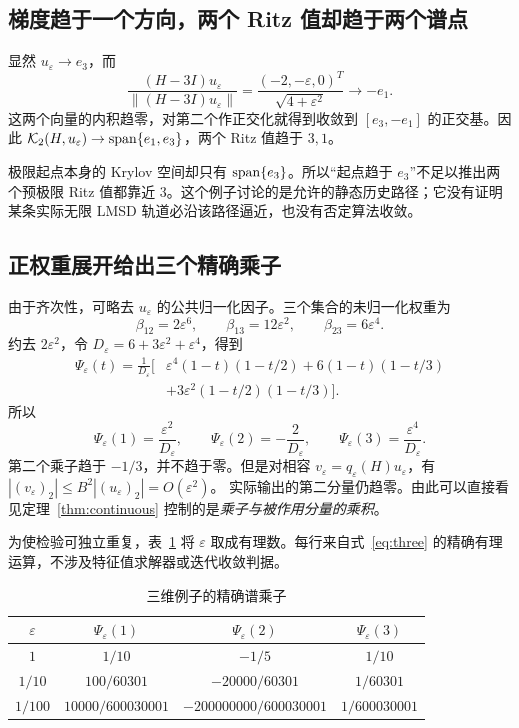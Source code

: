 \documentclass[UTF8,zihao=-4,a4paper]{ctexart}
\theoremstyle{definition}\newtheorem{example}[theorem]{例}
\newcommand{\norm}[1]{\left\lVert#1\right\rVert}
\newcommand{\K}{\mathcal K}\newcommand{\I}{\mathcal I}
\begin{document}
\subsection{梯度趋于一个方向，两个 Ritz 值却趋于两个谱点}

显然 $u_\varepsilon\to e_3$，而
\[
 \frac{(H-3I)u_\varepsilon}{\norm{(H-3I)u_\varepsilon}}
 =\frac{(-2,-\varepsilon,0)^T}{\sqrt{4+\varepsilon^2}}
 \longrightarrow-e_1.
\]
这两个向量的内积趋零，对第二个作正交化就得到收敛到 $[e_3,-e_1]$ 的正交基。因此
$\K_2(H,u_\varepsilon)\to\Span\{e_1,e_3\}$，两个 Ritz 值趋于 $3,1$。

极限起点本身的 Krylov 空间却只有 $\operatorname{span}\{e_3\}$。所以“起点趋于 $e_3$”不足以推出两个预极限 Ritz 值都靠近 $3$。这个例子讨论的是允许的静态历史路径；它没有证明某条实际无限 LMSD 轨道必沿该路径逼近，也没有否定算法收敛。

\subsection{正权重展开给出三个精确乘子}

由于齐次性，可略去 $u_\varepsilon$ 的公共归一化因子。三个集合的未归一化权重为
\[
 \beta_{12}=2\varepsilon^6,\qquad
 \beta_{13}=12\varepsilon^2,\qquad
 \beta_{23}=6\varepsilon^4.
\]
约去 $2\varepsilon^2$，令 $D_\varepsilon=6+3\varepsilon^2+\varepsilon^4$，得到
\begin{equation}\label{eq:explicitPsi}
 \begin{aligned}
 \Psi_\varepsilon(t)=\frac{1}{D_\varepsilon}\bigl[
 &\varepsilon^4(1-t)(1-t/2)
 +6(1-t)(1-t/3)\\
 &+3\varepsilon^2(1-t/2)(1-t/3)\bigr].
 \end{aligned}
\end{equation}
所以
\begin{equation}\label{eq:three}
 \Psi_\varepsilon(1)=\frac{\varepsilon^2}{D_\varepsilon},\qquad
 \Psi_\varepsilon(2)=-\frac{2}{D_\varepsilon},\qquad
 \Psi_\varepsilon(3)=\frac{\varepsilon^4}{D_\varepsilon}.
\end{equation}
第二个乘子趋于 $-1/3$，并不趋于零。但是对相容 $v_\varepsilon=q_\varepsilon(H)u_\varepsilon$，有
$|(v_\varepsilon)_2|\le B^2|(u_\varepsilon)_2|=O(\varepsilon^2)$。
实际输出的第二分量仍趋零。由此可以直接看见定理~\ref{thm:continuous} 控制的是\emph{乘子与被作用分量的乘积}。

为使检验可独立重复，表~\ref{tab:exact} 将 $\varepsilon$ 取成有理数。每行来自式~\eqref{eq:three} 的精确有理运算，不涉及特征值求解器或迭代收敛判据。
\begin{table}[htbp]\centering
\caption{三维例子的精确谱乘子}\label{tab:exact}
\small
\begin{tabular}{cccc}\toprule
$\varepsilon$ & $\Psi_\varepsilon(1)$ & $\Psi_\varepsilon(2)$ & $\Psi_\varepsilon(3)$\\\midrule
$1$ & $1/10$ & $-1/5$ & $1/10$\\
$1/10$ & $100/60301$ & $-20000/60301$ & $1/60301$\\
$1/100$ & $10000/600030001$ & $-200000000/600030001$ & $1/600030001$\\\bottomrule
\end{tabular}
\end{table}
\end{document}

